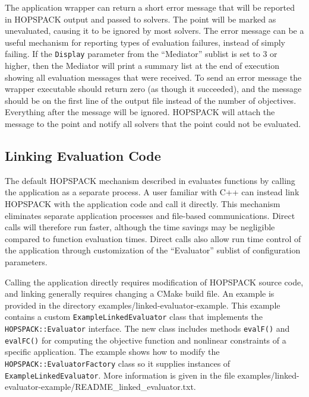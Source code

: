 The application wrapper can return a short error message that will be
reported in HOPSPACK output and passed to solvers.  The point will be
marked as unevaluated, causing it to be ignored by most solvers.
The error message can be a useful mechanism for reporting types of evaluation
failures, instead of simply failing.
If the {\tt Display} parameter from the ``Mediator'' sublist is set to 3
or higher, then the Mediator will print a summary list at the end of execution
showing all evaluation messages that were received.
To send an error message the wrapper executable should return zero
(as though it succeeded), and the message should be on the first line of
the output file instead of the number of objectives.  Everything after the
message will be ignored.
HOPSPACK will attach the message to the point and notify all solvers that
the point could not be evaluated.


\subsection{Linking Evaluation Code}
\label{subcalleval:inlineeval}

The default HOPSPACK mechanism described in 
evaluates functions by calling the application as a separate process.
A user familiar with C++ can instead link HOPSPACK with the application
code and call it directly.  This mechanism eliminates separate application
processes and file-based communications.  Direct calls will therefore run faster,
although the time savings may be negligible compared to function evaluation
times.
Direct calls also allow run time control of the application through
customization of the ``Evaluator'' sublist of configuration parameters.

Calling the application directly requires modification of HOPSPACK source
code, and linking generally requires changing a CMake build file.
An example is provided in the directory {\sf examples/linked-evaluator-example}.
This example contains a custom {\tt ExampleLinkedEvaluator} class
that implements the {\tt HOPSPACK::Evaluator} interface.  The new class
includes methods {\tt evalF()} and {\tt evalFC()} for computing the
objective function and nonlinear constraints of a specific application.
The example shows how to modify the {\tt HOPSPACK::EvaluatorFactory} class
so it supplies instances of {\tt ExampleLinkedEvaluator}.
More information is given in the file
{\sf examples/linked-evaluator-example/README\_linked\_evaluator.txt}.

